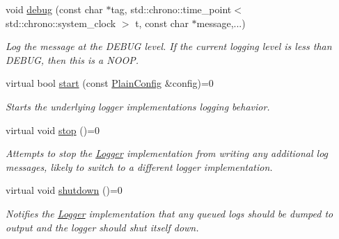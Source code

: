 \begin{DoxyCompactItemize}
void \hyperlink{class_aws_1_1_iot_1_1_device_client_1_1_logging_1_1_logger_ad64e2decc9c73a45717f1d87bb3d404a}{debug} (const char $\ast$tag, std\+::chrono\+::time\+\_\+point$<$ std\+::chrono\+::system\+\_\+clock $>$ t, const char $\ast$message,...)
\begin{DoxyCompactList}\small\item\em Log the message at the D\+E\+B\+UG level. If the current logging level is less than D\+E\+B\+UG, then this is a N\+O\+OP. \end{DoxyCompactList}\item 
virtual bool \hyperlink{class_aws_1_1_iot_1_1_device_client_1_1_logging_1_1_logger_ad42e38afcd7402f5dc1213b2f0b96961}{start} (const \hyperlink{struct_aws_1_1_iot_1_1_device_client_1_1_plain_config}{Plain\+Config} \&config)=0
\begin{DoxyCompactList}\small\item\em Starts the underlying logger implementation\textquotesingle{}s logging behavior. \end{DoxyCompactList}\item 
\mbox{\label{class_aws_1_1_iot_1_1_device_client_1_1_logging_1_1_logger_a1bfa1932649b6189dc685a9ba943fef8}} 
virtual void \hyperlink{class_aws_1_1_iot_1_1_device_client_1_1_logging_1_1_logger_a1bfa1932649b6189dc685a9ba943fef8}{stop} ()=0
\begin{DoxyCompactList}\small\item\em Attempts to stop the \hyperlink{class_aws_1_1_iot_1_1_device_client_1_1_logging_1_1_logger}{Logger} implementation from writing any additional log messages, likely to switch to a different logger implementation. \end{DoxyCompactList}\item 
\mbox{\label{class_aws_1_1_iot_1_1_device_client_1_1_logging_1_1_logger_a0531d2c3daf665bb5751f2f219d3ca6e}} 
virtual void \hyperlink{class_aws_1_1_iot_1_1_device_client_1_1_logging_1_1_logger_a0531d2c3daf665bb5751f2f219d3ca6e}{shutdown} ()=0
\begin{DoxyCompactList}\small\item\em Notifies the \hyperlink{class_aws_1_1_iot_1_1_device_client_1_1_logging_1_1_logger}{Logger} implementation that any queued logs should be dumped to output and the logger should shut itself down. \end{DoxyCompactList}\item 

\end{DoxyCompactItemize}
